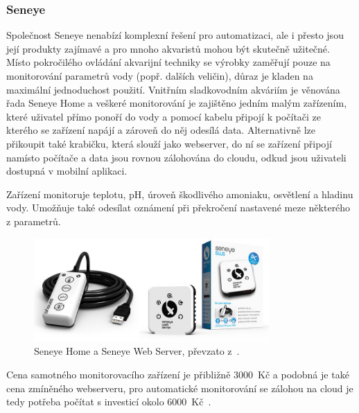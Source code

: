         \subsubsection{Seneye}
            Společnost Seneye nenabízí komplexní řešení pro automatizaci, ale i přesto jsou její produkty zajímavé a pro mnoho akvaristů mohou být skutečně užitečné. Místo pokročilého ovládání akvarijní techniky se výrobky zaměřují pouze na monitorování parametrů vody (popř. dalších veličin), důraz je kladen na maximální jednoduchost použití. Vnitřním sladkovodním akváriím je věnována řada Seneye Home a veškeré monitorování je zajištěno jedním malým zařízením, které uživatel přímo ponoří do vody a pomocí kabelu připojí k počítači ze kterého se zařízení napájí a zároveň do něj odesílá data. Alternativně lze přikoupit také krabičku, která slouží jako webserver, do ní se zařízení připojí namísto počítače a data jsou rovnou zálohována do cloudu, odkud jsou uživateli dostupná v mobilní aplikaci.

            Zařízení monitoruje teplotu, pH, úroveň škodlivého amoniaku, osvětlení a hladinu vody. Umožňuje také odesílat oznámení při překročení nastavené meze některého z parametrů.

            \begin{figure}[h!]
                \centering
                \includegraphics[width=0.8\textwidth]{obrazky/trh/seneye-home.jpg}
                \caption{Seneye Home a Seneye Web Server, převzato z~\cite{seneye-home}.}
                \label{fig:obrazky-trh-seneye-home-jpg}
            \end{figure}

            Cena samotného monitorovacího zařízení je přibližně \qty{3000}{Kč} a podobná je také cena zmíněného webserveru, pro automatické monitorování se zálohou na cloud je tedy potřeba počítat s investicí okolo \qty{6000}{Kč}~\cite{seneye-home}.
            


        